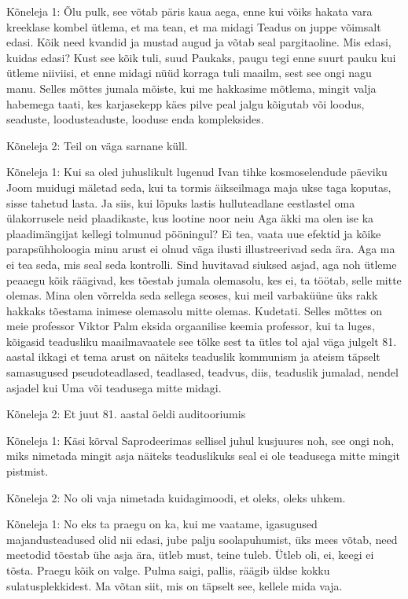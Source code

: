 Kõneleja 1:
Õlu pulk, see võtab päris kaua aega, enne kui võiks hakata vara kreeklase kombel ütlema, et ma tean, et ma midagi
Teadus on juppe võimsalt edasi. Kõik need kvandid ja mustad augud ja võtab seal pargitaoline. Mis edasi, kuidas edasi? Kust see kõik tuli, suud Paukaks, paugu tegi enne suurt pauku kui ütleme niiviisi, et enne midagi nüüd korraga tuli maailm, sest see ongi nagu manu. Selles mõttes jumala mõiste, kui me hakkasime mõtlema, mingit valja habemega taati, kes karjasekepp käes pilve peal jalgu kõigutab või loodus, seaduste, loodusteaduste, looduse enda kompleksides.
                 
Kõneleja 2:
Teil on väga sarnane küll.
                 
Kõneleja 1:
Kui sa oled juhuslikult lugenud Ivan tihke kosmoselendude päeviku Joom muidugi mäletad seda, kui ta tormis äikseilmaga maja ukse taga koputas, sisse tahetud lasta. Ja siis, kui lõpuks lastis hulluteadlane eestlastel oma ülakorrusele neid plaadikaste, kus lootine noor neiu
Aga äkki ma olen ise ka plaadimängijat kellegi tolmunud pööningul? Ei tea, vaata uue efektid ja kõike parapsühholoogia minu arust ei olnud väga ilusti illustreerivad seda ära. Aga ma ei tea seda, mis seal seda kontrolli. Sind huvitavad siuksed asjad, aga noh ütleme peaaegu kõik räägivad, kes tõestab jumala olemasolu, kes ei, ta töötab, selle mitte olemas. Mina olen võrrelda seda sellega seoses, kui meil varbaküüne üks rakk hakkaks tõestama inimese olemasolu mitte olemas. Kudetati.
Selles mõttes on meie professor Viktor Palm eksida orgaanilise keemia professor, kui ta luges, kõigasid teadusliku maailmavaatele see tõlke sest ta ütles tol ajal väga julgelt 81. aastal ikkagi et tema arust on näiteks teaduslik kommunism ja ateism täpselt samasugused pseudoteadlased, teadlased, teadvus, diis, teaduslik jumalad, nendel asjadel kui Uma või teadusega mitte midagi.
                 
Kõneleja 2:
Et juut 81. aastal öeldi auditooriumis
                 
Kõneleja 1:
Käsi kõrval Saprodeerimas sellisel juhul kusjuures noh, see ongi noh, miks nimetada mingit asja näiteks teaduslikuks seal ei ole teadusega mitte mingit pistmist.
                 
Kõneleja 2:
No oli vaja nimetada kuidagimoodi, et oleks, oleks uhkem.
                 
Kõneleja 1:
No eks ta praegu on ka, kui me vaatame, igasugused majandusteadused olid nii edasi, jube palju soolapuhumist, üks mees võtab, need meetodid tõestab ühe asja ära, ütleb must, teine tuleb. Ütleb oli, ei, keegi ei tõsta. Praegu kõik on valge. Pulma saigi, pallis, räägib üldse kokku sulatusplekkidest. Ma võtan siit, mis on täpselt see, kellele mida vaja.
                 
